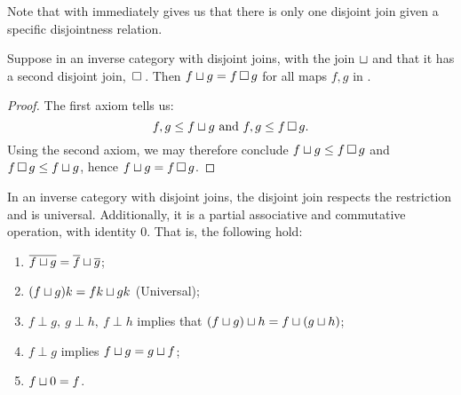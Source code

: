 Note that  with  immediately gives us that there is only one disjoint
join given a specific disjointness relation.
\begin{lemma}\label{lem:disjoint_join_is_unique}
  Suppose \X in an inverse category with disjoint joins, with the join $\sqcup$ and that it
  has a second disjoint join, $\,\square\,$. Then $f \sqcup g = f \,\square\, g$ for all maps $f,g$ in
  \X.
\end{lemma}
\begin{proof}
  The first axiom tells us:
  \[
    f,g \le f\sqcup g\text{ and }f,g \le f \,\square\, g.
  \]
  Using the second axiom, we may therefore conclude $f \sqcup g \le f \,\square\, g$ and
  $f \,\square\, g \le f\sqcup g$, hence $f \sqcup g = f \,\square\, g$.
\end{proof}
\begin{lemma}\label{lem:join_is_associative_and_commutative_monoid}
  In an inverse category with disjoint joins, the disjoint join respects the restriction and is
  universal. Additionally, it is a partial associative and
  commutative operation, with identity $0$. That is, the following hold:
  \begin{enumerate}[{(}i{)}]
    \item $\overline{f\sqcup g} = \overline{f} \sqcup \overline{g}$;
    \item $(f \sqcup g)k = f k \sqcup g k$ (Universal);
    \item $f \perp g,\ g\perp h,\ f\perp h$ implies that $(f\sqcup g)\sqcup h = f\sqcup(g\sqcup
      h)$; \label{lemitem:associative_join}
    \item $f \perp g$ implies $f \sqcup g = g \sqcup f$; \label{lemitem:commutative_join}
    \item $f \sqcup 0 = f$. \label{lemitem:identity_for_join}
  \end{enumerate}
\end{lemma}
